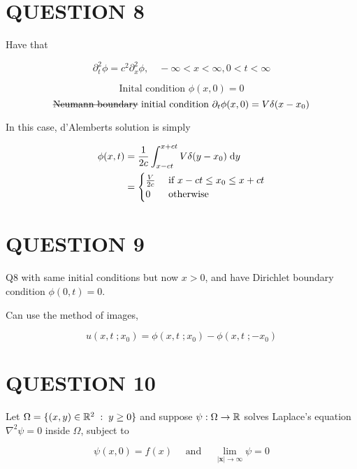 \documentclass[a4paper]{article}
\begin{document}
\section{QUESTION 8}

Have that 

\[ \partial_{t}^{2} \phi = c^{2} \partial_{x}^{2} \phi, \quad -\infty < x < \infty, 0 < t < \infty \]

\[ \text{Inital condition } \phi(x,0) = 0 \]
\[ \text{\st{Neumann boundary}} \text{ initial condition }  \partial_{t} \phi(x,0) = V \delta(x - x_{0}) \]

In this case, d'Alemberts solution is simply

\begin{align*}
\phi(x,t) & = \frac{1}{2c} \int_{x - ct}^{x + ct} V \delta(y - x_{0}) \; \mathrm{d} y \\
& = \begin{cases} \frac{V}{2c}  & \text{ if } x - ct \leq x_{0} \leq x + ct  \\ 0 & \text{ otherwise } \end{cases}
\end{align*}








\section{QUESTION 9}

Q8 with same initial conditions but now $ x > 0 $, and have Dirichlet boundary condition $ \phi(0,t) = 0 $.

Can use the method of images,

\[ u(x,t \; ;  x_{0}) = \phi(x,t \; ; x_{0}) - \phi(x,t \; ; - x_{0})   \]



\section{QUESTION 10}

Let $ \Omega = \{  (x,y) \in \mathbb{R}^{2} \; : \; y \geq 0 \} $ and suppose $ \psi : \Omega \to \mathbb{R} $ solves Laplace's equation $ \nabla^{2} \psi = 0 $ inside $ \Omega $, subject to

\[ \psi(x,0) = f(x) \quad \text{ and } \quad \lim\limits_{| \mathbf{x} | \to \infty} \psi = 0 \]
\end{document}
